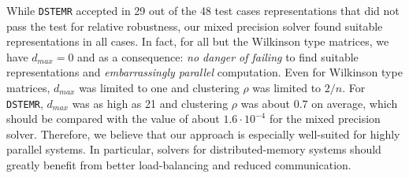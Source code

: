 \documentclass[final]{siamltex}
\begin{document}
 While {\tt DSTEMR} accepted in 29 out of the 48 test cases representations
 that did not pass the test for relative robustness, our mixed precision
 solver found suitable representations in all cases. In fact, 
for all but the Wilkinson type matrices, we have $d_{max} = 0$ and as a
consequence: {\it no danger of failing} to find suitable representations and
{\it embarrassingly parallel} computation. 
Even for Wilkinson type matrices, $d_{max}$ was limited to one
and clustering $\rho$ was limited to $2/n$. 
For {\tt DSTEMR}, $d_{max}$ was as high as 21 and clustering $\rho$ was
about $0.7$ on average, which should 
be compared with the value of about $1.6 \cdot 10^{-4}$ for the mixed precision solver.
Therefore, we
believe that our approach is especially well-suited for highly parallel
systems. In particular, solvers for distributed-memory systems should greatly
benefit from better load-balancing and reduced communication. 
\end{document}
